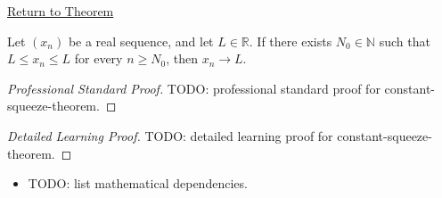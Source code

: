 \newpage
{}
\label{prf:constant-squeeze-theorem}

\begin{remark*}[Return]
\hyperref[thm:constant-squeeze-theorem]{Return to Theorem}
\end{remark*}

\begin{theorem*}
Let $(x_n)$ be a real sequence, and let $L\in\mathbb{R}$. If there
exists $N_0\in\mathbb{N}$ such that $L\le x_n\le L$ for every
$n\ge N_0$, then $x_n\to L$.

\smallskip
\noindent
\end{theorem*}

\begin{proof}[Professional Standard Proof]
\LRAProofBodyStart
TODO: professional standard proof for constant-squeeze-theorem.
\end{proof}

\begin{proof}[Detailed Learning Proof]
\LRAProofBodyStart
TODO: detailed learning proof for constant-squeeze-theorem.
\end{proof}

\begin{remark*}
\end{remark*}

\begin{dependencies}
\begin{itemize}
  \item TODO: list mathematical dependencies.
\end{itemize}
\end{dependencies}

\clearpage

